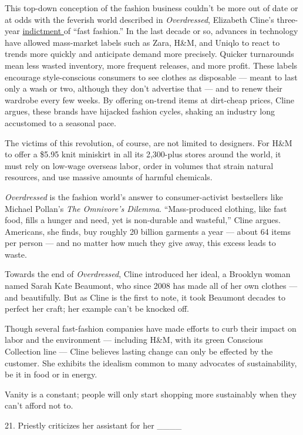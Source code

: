 \documentclass[UTF8,11pt]{ctexart}
\begin{document}
This top-down conception of the fashion business couldn’t be more out of date or at odds with the feverish world described in \textit{Overdressed}, Elizabeth Cline’s three-year \uline{indictment }of “fast fashion.” In the last decade or so, advances in technology have allowed mass-market labels such as Zara, H\&M, and Uniqlo to react to trends more quickly and anticipate demand more precisely. Quicker turnarounds mean less wasted inventory, more frequent releases, and more profit. These labels encourage style-conscious consumers to see clothes as disposable — meant to last only a wash or two, although they don’t advertise that — and to renew their wardrobe every few weeks. By offering on-trend items at dirt-cheap prices, Cline argues, these brands have hijacked fashion cycles, shaking an industry long accustomed to a seasonal pace.


The victims of this revolution, of course, are not limited to designers. For H\&M to offer a \$5.95 knit miniskirt in all its 2,300-plus stores around the world, it must rely on low-wage overseas labor, order in volumes that strain natural resources, and use massive amounts of harmful chemicals.


\textit{Overdressed} is the fashion world’s answer to consumer-activist bestsellers like Michael Pollan’s \textit{The Omnivore’s Dilemma}. “Mass-produced clothing, like fast food, fills a hunger and need, yet is non-durable and wasteful,” Cline argues. Americans, she finds, buy roughly 20 billion garments a year — about 64 items per person — and no matter how much they give away, this excess leads to waste.


Towards the end of \textit{Overdressed}, Cline introduced her ideal, a Brooklyn woman named Sarah Kate Beaumont, who since 2008 has made all of her own clothes — and beautifully. But as Cline is the first to note, it took Beaumont decades to perfect her craft; her example can’t be knocked off.


Though several fast-fashion companies have made efforts to curb their impact on labor and the environment — including H\&M, with its green Conscious Collection line — Cline believes lasting change can only be effected by the customer. She exhibits the idealism common to many advocates of sustainability, be it in food or in energy.


Vanity is a constant; people will only start shopping more sustainably when they can’t afford not to.


21. Priestly criticizes her assistant for her \_\_\_\_
\end{document}
